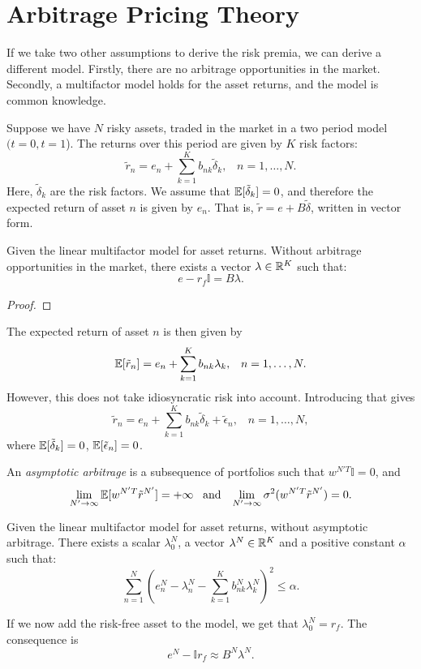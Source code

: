 \documentclass[twoside, titlepage]{article}
\begin{document}
\section{Arbitrage Pricing Theory}

If we take two other assumptions to derive the risk premia, we can derive a different model. Firstly, there are no arbitrage opportunities in the market. Secondly, a multifactor model holds for the asset returns, and the model is common knowledge.

Suppose we have $N$ risky assets, traded in the market in a two period model $(t=0, t=1$). The returns over this period are given by $K$ risk factors:
\[
    \tilde{r}_n = e_n + \sum_{k=1}^{K} b_{nk} \tilde{\delta}_k, \;\;\; n = 1, \dots, N.
\]
Here, $\tilde{\delta}_k$ are the risk factors. We assume that $\mathbb{E}[\tilde{\delta}_k] = 0$, and therefore the expected return of asset $n$ is given by $e_n$. That is, $\tilde{r} = e + B\tilde{\delta}$, written in vector form.

\begin{proposition} \label{prop:5.2}
    Given the linear multifactor model for asset returns. Without arbitrage opportunities in the market, there exists a vector $\lambda \in \mathbb{R}^K$ such that:
    \[
        e - r_f\mathbb{I} = B\lambda.
    \]
\end{proposition}

\begin{proof}
\end{proof}

The expected return of asset $n$ is then given by
\[
    \mathbb{E}[\tilde{r}_n] = e_n + \sum_{k=1}^{K} b_{nk} \lambda_k, \;\;\; n = 1, \dots, N.
\]
However, this does not take idiosyncratic risk into account. Introducing that gives
\[
    \tilde{r}_n = e_n + \sum_{k=1}^{K} b_{nk} \tilde{\delta}_k + \tilde{\epsilon}_n, \;\;\; n = 1, \dots, N,
\]
where $\mathbb{E}[\tilde{\delta}_k] = 0$, $\mathbb{E}[\tilde{\epsilon}_n] = 0$.

An \textit{asymptotic arbitrage} is a subsequence of portfolios such that $w^{N'T}\mathbb{I} = 0$, and
\[
    \lim_{N' \to \infty} \mathbb{E}[w^{N'T}\tilde{r}^{N'}] = +\infty \;\;\; \text{and} \;\;\; \lim_{N' \to \infty} \sigma^2(w^{N'T}\tilde{r}^{N'}) = 0.
\]
\begin{proposition}
    Given the linear multifactor model for asset returns, without asymptotic arbitrage. There exists a scalar $\lambda^N_0$, a vector $\lambda^N \in \mathbb{R}^K$ and a positive constant $\alpha$ such that:
    \[
        \sum_{n=1}^{N}\left(e^N_n - \lambda^N_n - \sum_{k=1}^{K} b^N_{nk} \lambda^N_k\right)^2 \leq \alpha.
    \]
\end{proposition}
If we now add the risk-free asset to the model, we get that $\lambda^N_0 = r_f$. The consequence is
\[
    e^N - \mathbb{I}r_f \approx B^N \lambda^N.
\]
\end{document}
